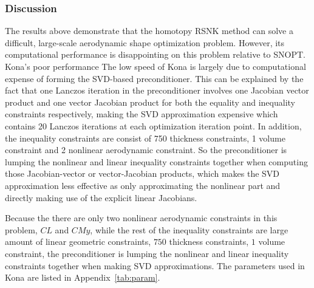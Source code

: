 \subsubsection{Discussion}
The results above demonstrate that the homotopy RSNK method can solve 
a difficult, large-scale aerodynamic shape optimization problem.
However, its computational performance is disappointing on this problem relative to SNOPT. 
Kona's poor performance 
The low speed of Kona is largely due to computational expense of forming the SVD-based 
preconditioner. This can be explained by the fact that one Lanczos iteration in the preconditioner involves  
one Jacobian vector product and one vector Jacobian product for both the equality and inequality constraints 
respectively, making the SVD approximation expensive which contains 20 Lanczos iterations at each optimization iteration point. In addition, the inequality constraints are consist of 750 thickness constraints, 1 volume constraint and 2 nonlinear aerodynamic constraint. So the preconditioner is lumping the nonlinear and linear inequality constraints together when computing those Jacobian-vector or vector-Jacobian products, which makes the SVD approximation less effective as only approximating the nonlinear part and directly making use of the explicit linear Jacobians. 

Because the there are only two nonlinear aerodynamic constraints in this problem, $CL$ and $CMy$, while the rest of the inequality constraints are large amount of linear geometric constraints, $750$ thickness constraints, $1$ volume constraint, the preconditioner is lumping the nonlinear and linear inequality constraints together when making SVD approximations.  The parameters used in Kona are listed in Appendix~\ref{tab:param}.  


